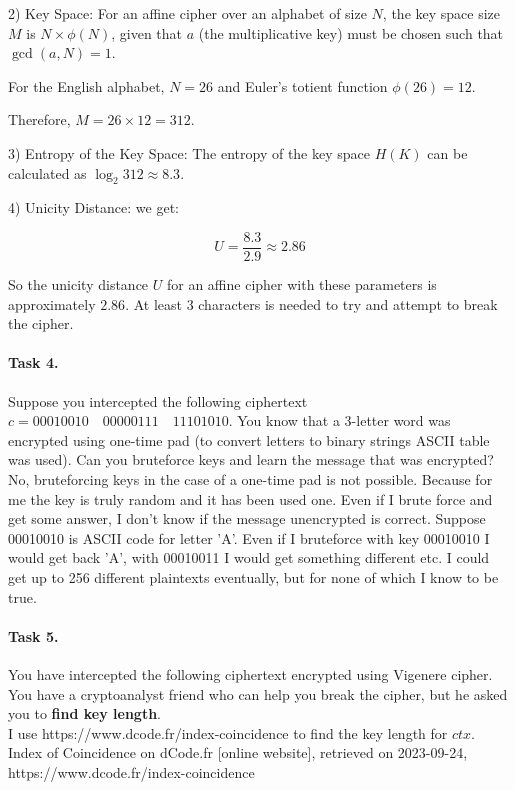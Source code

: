\documentclass{article}
\begin{document}
2) Key Space:
For an affine cipher over an alphabet of size \( N \), the key space size \( M \) is \( N \times \phi(N) \), given that \( a \) (the multiplicative key) must be chosen such that \( \gcd(a, N) = 1 \).

For the English alphabet, \( N = 26 \) and Euler's totient function \( \phi(26) = 12 \).

Therefore, \( M = 26 \times 12 = 312 \).

3) Entropy of the Key Space:
The entropy of the key space \( H(K) \) can be calculated as \( \log_2 312 \approx 8.3 \).

4) Unicity Distance:
we get:

\[
  U = \frac{8.3}{2.9} \approx 2.86
\]

So the unicity distance \( U \) for an affine cipher with these parameters is approximately \(2.86\).
At least 3 characters is needed to try and attempt to break the cipher.


\paragraph{Task 4.} Suppose you intercepted the following ciphertext $c = 00010010 \quad 00000111 \quad 11101010$. You know that a
3-letter word was encrypted using one-time pad (to convert letters to binary strings ASCII table was used). Can you bruteforce keys and
learn the message that was encrypted?\\

No, bruteforcing keys in the case of a one-time pad is not possible. Because for me the key is truly random and it has been used one.
Even if I brute force and get some answer, I don't know if the message unencrypted is correct. Suppose 00010010 is ASCII code for letter
'A'. Even if I bruteforce with key 00010010 I would get back 'A', with 00010011 I would get something different etc. I could get up to 256
different plaintexts eventually, but for none of which I know to be true.



\paragraph{Task 5.}
You have intercepted the following ciphertext encrypted using Vigenere cipher. You have a cryptoanalyst friend who can help you break the cipher, but he asked you to \textbf{find key length}. \\

I use https://www.dcode.fr/index-coincidence to find the key length for $ctx$. Index of Coincidence on dCode.fr [online website], retrieved on 2023-09-24, https://www.dcode.fr/index-coincidence
\end{document}
